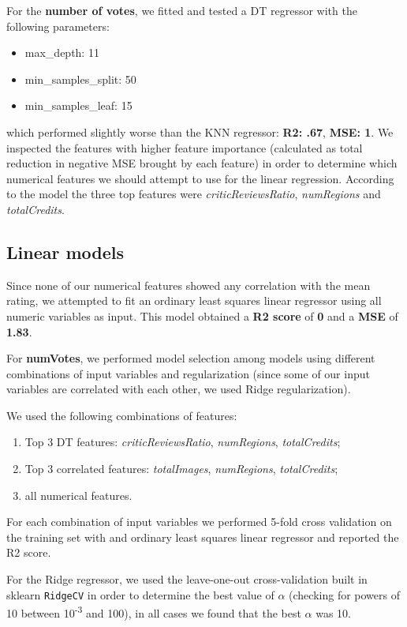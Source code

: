 For the \textbf{number of votes}, we fitted and tested a DT regressor with the following parameters:
\begin{itemize}
    \item max\_depth: 11
    \item min\_samples\_split: 50
    \item min\_samples\_leaf: 15
\end{itemize}
which performed slightly worse than the KNN regressor:
\textbf{R2: .67}, \textbf{MSE: 1}.
We inspected the features with higher feature importance (calculated as total reduction in negative MSE brought by each feature) in order to determine which numerical features we should attempt to use for the linear regression.
According to the model the three top features were \emph{criticReviewsRatio}, \emph{numRegions} and \emph{totalCredits}.

\subsection{Linear models}

Since none of our numerical features showed any correlation with the mean rating, we attempted to fit an ordinary least squares linear regressor using all numeric variables as input.
This model obtained a \textbf{R2 score} of \textbf{0} and a \textbf{MSE} of \textbf{1.83}.

For \textbf{numVotes}, we performed model selection among models using different combinations of input variables and regularization (since some of our input variables are correlated with each other, we used Ridge regularization).

We used the following combinations of features:
\begin{enumerate}
    \item Top 3 DT features: \emph{criticReviewsRatio}, \emph{numRegions}, \emph{totalCredits};
    \item Top 3 correlated features: \emph{totalImages}, \emph{numRegions}, \emph{totalCredits};
    \item all numerical features.
\end{enumerate}
For each combination of input variables we performed 5-fold cross validation on the training set with and ordinary least squares linear regressor and reported the R2 score.

For the Ridge regressor, we used the leave-one-out cross-validation built in sklearn \texttt{RidgeCV} in order to determine the best value of $\alpha$ (checking for powers of 10 between 10\textsuperscript{-3} and 100), in all cases we found that the best $\alpha$ was 10.

